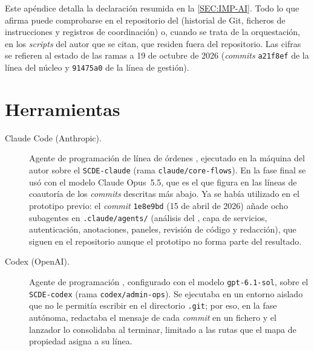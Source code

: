 
Este apéndice detalla la declaración resumida en la \cref{SEC:IMP-AI}. Todo lo que afirma
puede comprobarse en el repositorio del  (historial de Git, ficheros de
instrucciones y registros de coordinación) o, cuando se trata de la orquestación, en los
\textit{scripts} del autor que se citan, que residen fuera del repositorio. Las cifras se
refieren al estado de las ramas a 19 de octubre de 2026 (\textit{commits} \texttt{a21f8ef}
de la línea del núcleo y \texttt{91475a0} de la línea de gestión).

\section*{Herramientas}

\begin{description}
  \item[Claude Code (Anthropic).] Agente de programación de línea de órdenes
        \cite{claude_code_docs}, ejecutado en la máquina del autor sobre el
         \texttt{SCDE-claude} (rama \texttt{claude/core-flows}). En la fase
        final se usó con el modelo Claude Opus~5.5, que es el que figura en las líneas de
        coautoría de los \textit{commits} descritas más abajo. Ya se había utilizado en el
        prototipo previo: el \textit{commit} \texttt{1e8e9bd} (15 de abril de 2026) añade
        ocho subagentes en \texttt{.claude/agents/} (análisis del , capa de
        servicios, autenticación, anotaciones, paneles, revisión de código y redacción),
        que siguen en el repositorio aunque el prototipo no forma parte del resultado.
  \item[Codex (OpenAI).] Agente de programación \cite{openai_codex}, configurado con el
        modelo \texttt{gpt-6.1-sol}, sobre el  \texttt{SCDE-codex} (rama
        \texttt{codex/admin-ops}). Se ejecutaba en un entorno aislado que no le permitía
        escribir en el directorio \texttt{.git}; por eso, en la fase autónoma, redactaba
        el mensaje de cada \textit{commit} en un fichero y el lanzador lo consolidaba al
        terminar, limitado a las rutas que el mapa de propiedad asigna a su línea.
\end{description}

